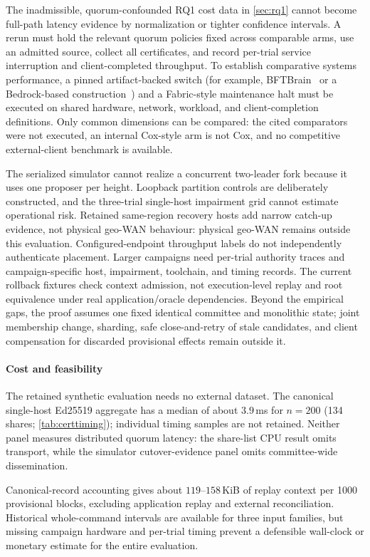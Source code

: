 The inadmissible, quorum-confounded RQ1 cost data in \cref{sec:rq1} cannot
become full-path latency evidence by normalization or tighter confidence
intervals. A rerun must hold the relevant quorum policies fixed across
comparable arms, use an admitted source, collect all certificates, and record
per-trial service interruption and client-completed throughput. To establish
comparative systems performance, a pinned artifact-backed switch (for example,
BFTBrain~\cite{bftbrain} or a Bedrock-based construction~\cite{bedrock})
and a Fabric-style maintenance halt must be executed on shared hardware,
network, workload, and client-completion definitions. Only common dimensions
can be compared: the cited comparators were not executed, an internal Cox-style
arm is not Cox, and no competitive external-client benchmark is available.

The serialized simulator cannot realize a concurrent two-leader fork because
it uses one proposer per height. Loopback partition controls are deliberately
constructed, and the three-trial single-host impairment grid cannot estimate
operational risk. Retained same-region recovery hosts add narrow catch-up evidence,
not physical geo-WAN behaviour: physical geo-WAN remains outside this evaluation.
Configured-endpoint throughput labels do not independently authenticate placement.
Larger campaigns need per-trial authority traces and campaign-specific host,
impairment, toolchain, and timing records. The current rollback fixtures
check context admission, not execution-level replay and root equivalence
under real application/oracle dependencies. Beyond the empirical gaps, the
proof assumes one fixed identical committee and monolithic state; joint
membership change, sharding, safe close-and-retry of stale candidates, and
client compensation for discarded provisional effects remain outside it.

\paragraph{Cost and feasibility}
The retained synthetic evaluation needs no external dataset. The canonical
single-host Ed25519 aggregate has a median of about $3.9$\,ms for $n=200$
(134 shares; \cref{tab:certtiming}); individual timing samples are not retained.
Neither panel measures distributed quorum latency: the share-list CPU result omits
transport, while the simulator cutover-evidence panel omits committee-wide dissemination.

Canonical-record accounting gives about $119$--$158$\,KiB
of replay context per 1000 provisional blocks, excluding application replay
and external reconciliation. Historical whole-command intervals are available
for three input families, but missing campaign hardware and per-trial timing
prevent a defensible wall-clock or monetary estimate for the entire evaluation.

